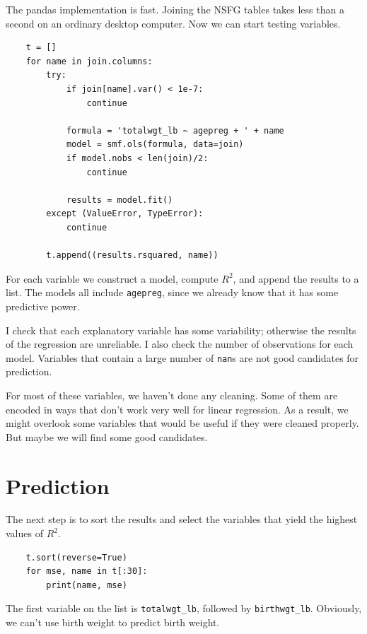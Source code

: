 \documentclass[12pt]{book}
\begin{document}
The pandas implementation is fast.  Joining the NSFG tables takes
less than a second on an ordinary desktop computer.
Now we can start testing variables.

\begin{verbatim}
    t = []
    for name in join.columns:
        try:
            if join[name].var() < 1e-7:
                continue

            formula = 'totalwgt_lb ~ agepreg + ' + name
            model = smf.ols(formula, data=join)
            if model.nobs < len(join)/2:
                continue

            results = model.fit()
        except (ValueError, TypeError):
            continue

        t.append((results.rsquared, name))
\end{verbatim}

For each variable we construct a model, compute $R^2$, and append
the results to a list.  The models all include \verb"agepreg", since
we already know that it has some predictive power.

I check that each explanatory variable has some variability; otherwise
the results of the regression are unreliable.  I also check the number
of observations for each model.  Variables that contain a large number
of \verb"nan"s are not good candidates for prediction.

For most of these variables, we haven't done any cleaning.  Some of them
are encoded in ways that don't work very well for linear regression.
As a result, we might overlook some variables that would be useful if
they were cleaned properly.  But maybe we will find some good candidates.


\section{Prediction}

The next step is to sort the results and select the variables that
yield the highest values of $R^2$.

\begin{verbatim}
    t.sort(reverse=True)
    for mse, name in t[:30]:
        print(name, mse)
\end{verbatim}

The first variable on the list is \verb"totalwgt_lb",
followed by \verb"birthwgt_lb".  Obviously, we can't use birth
weight to predict birth weight.
\end{document}
